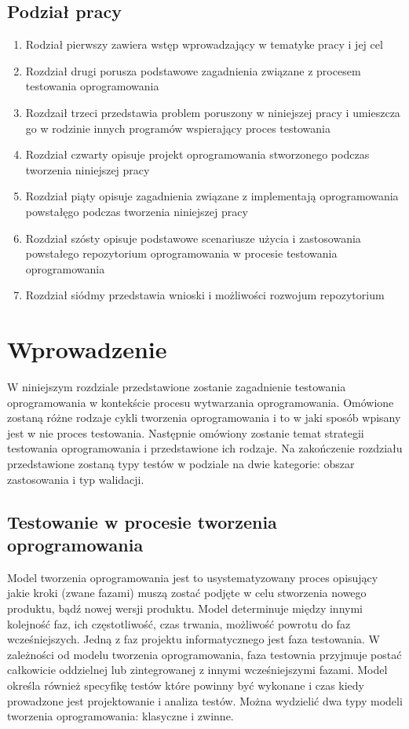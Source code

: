 \section{Podział pracy}
\begin{enumerate}
  \item Rodział pierwszy zawiera wstęp wprowadzający w tematyke pracy i jej  cel
  \item Rozdział drugi porusza podstawowe zagadnienia związane z procesem testowania oprogramowania
  \item Rozdzaił trzeci przedstawia problem poruszony w niniejszej pracy i umieszcza go w rodzinie innych programów wspierający proces testowania
  \item Rozdział czwarty opisuje projekt oprogramowania stworzonego podczas tworzenia niniejszej pracy
  \item Rozdział piąty opisuje zagadnienia związane z implementają oprogramowania powstałęgo podczas tworzenia niniejszej pracy
  \item Rozdział szósty opisuje podstawowe scenariusze użycia i zastosowania powstałego repozytorium oprogramowania w procesie testowania oprogramowania
  \item Rozdział siódmy przedstawia wnioski i możliwości rozwojum repozytorium 
\end{enumerate}


\chapter{Wprowadzenie}
W niniejszym rozdziale przedstawione zostanie zagadnienie testowania oprogramowania w kontekście procesu wytwarzania oprogramowania. Omówione zostaną różne rodzaje cykli tworzenia oprogramowania i to w jaki sposób wpisany jest w nie proces testowania. Następnie omówiony zostanie temat strategii testowania oprogramowania i przedstawione ich rodzaje. Na zakończenie rozdziału przedstawione zostaną typy testów w podziale na dwie kategorie: obszar zastosowania i typ walidacji.
\section{Testowanie w procesie tworzenia oprogramowania}
\label{sec:testowanieWprocesie}
Model tworzenia oprogramowania jest to usystematyzowany proces opisujący jakie kroki (zwane fazami) muszą zostać podjęte w celu stworzenia nowego produktu, bądź nowej wersji produktu. Model determinuje między innymi kolejność faz, ich częstotliwość, czas trwania, możliwość powrotu do faz wcześniejszych. Jedną z faz projektu informatycznego jest faza testowania. W zależności od modelu tworzenia oprogramowania, faza testownia przyjmuje postać całkowicie oddzielnej lub zintegrowanej z innymi wcześniejszymi fazami. Model określa również specyfikę testów które powinny być wykonane  i czas kiedy prowadzone jest projektowanie i analiza testów.
Można wydzielić dwa typy modeli tworzenia oprogramowania: klasyczne i zwinne.  
